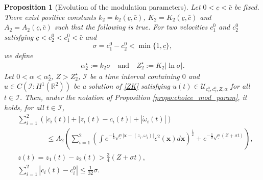 \documentclass[reqno,10pt]{amsart}
\newtheorem{propo}[lemm]{Proposition}
\numberwithin{equation}{section}
\newcommand{\bx}{\mathbf{x}}
\begin{document}
	\begin{propo}[Evolution of the modulation parameters]\label{propo:evol_mod_param}
		Let $0<\underline{c}<\bar{c}$ be fixed. There exist positive constants $k_2=k_2(\underline{c},\bar{c})$, $K_2=K_2(\underline{c},\bar{c})$ and $A_2=A_2(\underline{c},\bar{c})$  such that the following is true.   For two velocities $c_1^0$ and $c_2^0$ satisfying $\underline{c}<c_2^0<c_1^0<\bar{c}$ and 
        \begin{equation} \label{def:sigma}
        \sigma=c_1^0-c_2^0<\min\{1, \underline{c}\},
        \end{equation}
        we define
		\begin{align} \label{def:k2K2}
			\alpha^\star_2:= k_2\sigma \quad \text{and} \quad Z^\star_2 := K_2 | \ln \sigma| .
		\end{align}
		Let $0<\alpha<\alpha_2^{\star}$, $Z>Z_2^{\star}$, $\mathcal{I}$ be a time interval containing $0$ and $u \in C(\mathcal{I} : H^1(\mathbb R^2))$ be a solution of \eqref{ZK} satisfying $u(t) \in \mathcal{U}_{c_1^0, c_2^0, Z, \alpha}$ for all $t \in \mathcal{I}$. Then, under the notation of Proposition \ref{propo:choice_mod_param}, it holds, for all $t \in \mathcal{I}$, 
		\begin{align}
			&\sum_{i=1}^2 \left( \left\vert \dot{c}_i(t) \right\vert  + \left\vert \dot{z}_i(t) -c_i(t) \right\vert + \left\vert \dot{\omega}_i(t) \right\vert \right) \nonumber\\ & \quad \quad \quad \quad \leq A_2 \left( \sum_{i=1}^2\left( \int e^{- \frac{1}{4}\sqrt{\underline{c}} \left\vert \bx - \left( z_i,\omega_i \right) \right\vert } \epsilon^2(\bx) d\bx \right)^\frac12 + e^{-\frac12\sqrt{\underline{c}}\left( Z +  \sigma t \right) } \right), \label{eq:ODE} \\
			& z(t)=z_1(t)-z_2(t)  > \frac34\left(Z +\sigma t\right), \label{eq:boundz} \\
			&\sum_{i=1}^2\left\vert c_i(t) - c_i^0 \right\vert \leq \frac1{32} \sigma. \label{eq:c_n}
		\end{align}
	\end{propo}
	
\end{document}
